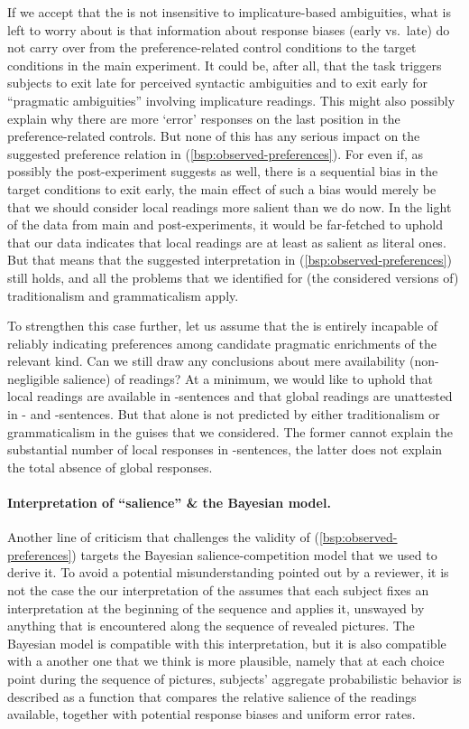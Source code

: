\documentclass[fleqn,reqno,10pt]{article}
\newcommand{\as}{\acro{as}}
\renewcommand{\es}{\acro{es}}
\newcommand{\ivt}{\acro{ivt}}
\begin{document}
If we accept that the \ivt is not insensitive to implicature-based
ambiguities, what is left to worry about is that information about
response biases (early vs.~late) do not carry over from the
preference-related control conditions to the target conditions in the
main experiment. It could be, after all, that the task triggers
subjects to exit late for perceived syntactic ambiguities and to exit
early for ``pragmatic ambiguities'' involving implicature
readings. This might also possibly explain why there are more `error'
responses on the last position in the preference-related controls. But
none of this has any serious impact on the suggested preference
relation in (\ref{bsp:observed-preferences}). For even if, as possibly
the post-experiment suggests as well, there is a sequential bias in
the target conditions to exit early, the main effect of such a bias would
merely be that we should consider local readings more salient than we
do now. In the light of the data from main and post-experiments, it
would be far-fetched to uphold that our data indicates that local
readings are at least as salient as literal ones. But that means that
the suggested interpretation in (\ref{bsp:observed-preferences}) still
holds, and all the problems that we identified for (the considered
versions of) traditionalism and grammaticalism apply. 

To strengthen this case further, let us assume that the \ivt is
entirely incapable of reliably indicating preferences among candidate
pragmatic enrichments of the relevant kind. Can we still draw any
conclusions about mere availability (non-negligible salience) of
readings? At a minimum, we would like to uphold that local readings
are available in \es-sentences and that global readings are unattested
in \as- and \es-sentences. But that alone is not predicted by either
traditionalism or grammaticalism in the guises that we considered. The
former cannot explain the substantial number of local responses in
\es-sentences, the latter does not explain the total absence of global
responses.

\paragraph{Interpretation of ``salience'' \& the Bayesian model.}
Another line of criticism that challenges the validity of
(\ref{bsp:observed-preferences}) targets the Bayesian
salience-competition model that we used to derive it. To avoid a
potential misunderstanding pointed out by a reviewer, it is not the
case the our interpretation of the \ivt assumes that each subject
fixes an interpretation at the beginning of the sequence and applies
it, unswayed by anything that is encountered along the sequence of
revealed pictures. The Bayesian model is compatible with this
interpretation, but it is also compatible with a another one that we
think is more plausible, namely that at each choice point during the
sequence of pictures, subjects' aggregate probabilistic behavior is
described as a function that compares the relative salience of the
readings available, together with potential response biases and
uniform error rates. 
\end{document}
